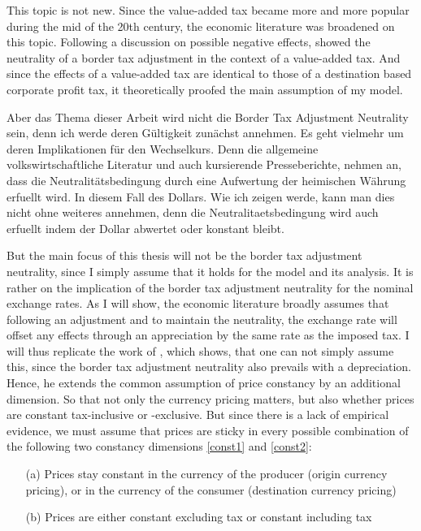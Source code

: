 This topic is not new. Since the value-added tax became more and more popular during the mid of the 20th century, the economic literature was broadened on this topic. Following a discussion on possible negative effects, \cite{Feldstein&Krugman} showed the  neutrality of a border tax adjustment in the context of a value-added tax. And since the effects of a value-added tax are identical to those of a destination based corporate profit tax, it theoretically proofed the main assumption of my model. 


Aber das Thema dieser Arbeit wird nicht die Border Tax Adjustment Neutrality sein, denn ich werde deren Gültigkeit zunächst annehmen. Es geht vielmehr um deren Implikationen für den Wechselkurs. Denn die allgemeine volkswirtschaftliche Literatur und auch kursierende Presseberichte, nehmen an, dass die Neutralitätsbedingung durch eine Aufwertung der heimischen Währung erfuellt wird. In diesem Fall des Dollars. Wie ich zeigen werde, kann man dies nicht ohne weiteres annehmen, denn die Neutralitaetsbedingung wird auch erfuellt indem der Dollar abwertet oder konstant bleibt. 

But the main focus of this thesis will not be the border tax adjustment neutrality, since I simply assume that it holds for the model and its analysis. It is rather on the implication of the border tax adjustment neutrality for the nominal exchange rates. As I will show, the economic literature broadly assumes that following an adjustment and to maintain the neutrality, the exchange rate will offset any effects through an appreciation by the same rate as the imposed tax. I will thus replicate the work of \cite{buiter2017exchange}, which shows, that one can not simply assume this, since the border tax adjustment neutrality also prevails with a depreciation.
Hence, he extends the common assumption of price constancy by an additional dimension. So that not only the currency pricing matters, but also whether prices are constant tax-inclusive or -exclusive. But since there is a lack of empirical evidence, we must assume that prices are sticky in every possible combination of the following two constancy dimensions \ref{const1} and \ref{const2}:

\begin{itemize}
\item[(a)] \label{const1} Prices stay constant in the currency of the producer (origin currency pricing), or in the currency of the consumer (destination currency pricing)
\item[(b)] \label{const2} Prices are either constant excluding tax or constant including tax 
\end{itemize}

